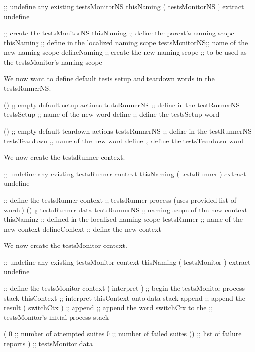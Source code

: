 \startJoylolCode
  ;; undefine any existing testsMonitorNS
  thisNaming
  ( testsMonitorNS ) extract
  undefine
  
  ;; create the testsMonitorNS
  thisNaming    ;; define the parent's naming scope
  thisNaming    ;; define in the localized naming scope
  testsMonitorNS;; name of the new naming scope
  defineNaming  ;; create the new naming scope
                ;; to be used as the testsMonitor's naming scope
\stopJoylolCode

We now want to define default tests setup and teardown words in the 
testsRunnerNS. 

\startJoylolCode
  ()            ;; empty default setup actions
  testsRunnerNS ;; define in the testRunnerNS
  testsSetup    ;; name of the new word
  define        ;; define the testsSetup word
\stopJoylolCode

\startJoylolCode
  ()            ;; empty default teardown actions
  testsRunnerNS ;; define in the testRunnerNS
  testsTeardown ;; name of the new word
  define        ;; define the testsTeardown word
\stopJoylolCode

We now create the testsRunner context.

\startJoylolCode
  ;; undefine any existing testsRunner context
  thisNaming
  ( testsRunner ) extract
  undefine

  ;; define the testsRunner context
                ;; testsRunner process (uses provided list of words)
  ()            ;; testsRunner data
  testsRunnerNS ;; naming scope of the new context
  thisNaming    ;; defined in the localized naming scope
  testsRunner   ;; name of the new context
  defineContext ;; define the new context
\stopJoylolCode

We now create the testsMonitor context.

\startJoylolCode
  ;; undefine any existing testsMonitor context
  thisNaming
  ( testsMonitor ) extract
  undefine

  ;; define the testsMonitor context
  ( interpret )   ;; begin the testsMonitor process stack
  thisContext     ;; interpret thisContext onto data stack
  append          ;; append the result
  ( switchCtx )   ;;
  append          ;; append the word switchCtx to the
                  ;; testsMonitor's initial process stack
  
  (
    0             ;; number of attempted suites
    0             ;; number of failed suites
    ()            ;; list of failure reports
  )               ;; testsMonitor data
  

